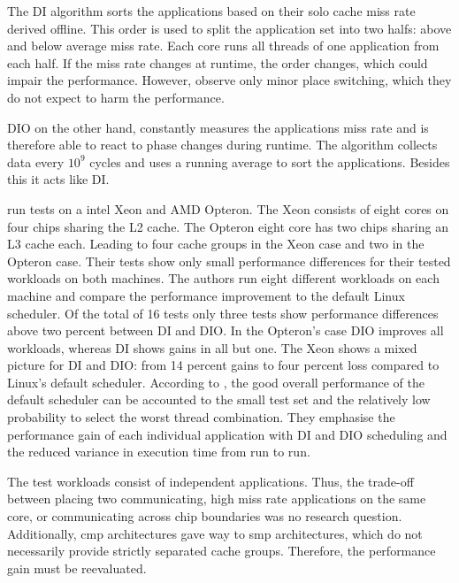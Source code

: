 The DI algorithm sorts the applications based on their solo cache miss rate derived
offline.
This order is used to split the application set into two halfs: above and below
average miss rate.
Each core runs all threads of one application from each half.
If the miss rate changes at runtime, the order changes, which could impair
the performance.
However, \citeauthor{zhuravlev_addressing_2010} observe only minor place
switching, which they do not expect to harm the performance.

DIO on the other hand, constantly measures the applications miss rate and is
therefore able to react to phase changes during runtime.
The algorithm collects data every $10^9$ cycles and uses a running average to
sort the applications.
Besides this it acts like DI.

\citeauthor{zhuravlev_addressing_2010} run tests on a \gls{intel}
Xeon and AMD Opteron.
The Xeon consists of eight cores on four chips sharing the L2 cache.
The Opteron eight core has two chips sharing an L3 cache each.
Leading to four cache groups in the Xeon case and two in the Opteron case.
Their tests show only small performance differences for their tested workloads
on both machines.
The authors run eight different workloads on each machine and compare the
performance improvement to the default Linux scheduler.
Of the total of 16 tests only three tests show performance differences above
two percent between DI and DIO.
In the Opteron's case DIO improves all workloads, whereas DI shows gains in
all but one.
The Xeon shows a mixed picture for DI and DIO: from 14 percent gains to four
percent loss compared to Linux's default scheduler.
According to \citeauthor{zhuravlev_addressing_2010}, the good overall
performance of the default scheduler can be accounted to the small test set and
the relatively low probability to select the worst thread combination.
They emphasise the performance gain of each individual application with DI and
DIO scheduling and the reduced variance in execution time from run to run.

The test workloads consist of independent applications.
Thus, the trade-off between placing two communicating, high miss rate
applications on the same core, or communicating across chip boundaries was no
research question.
Additionally, \gls{cmp} architectures gave way to \gls{smp} architectures,
which do not necessarily provide strictly separated cache groups.
Therefore, the performance gain must be reevaluated.
\\

